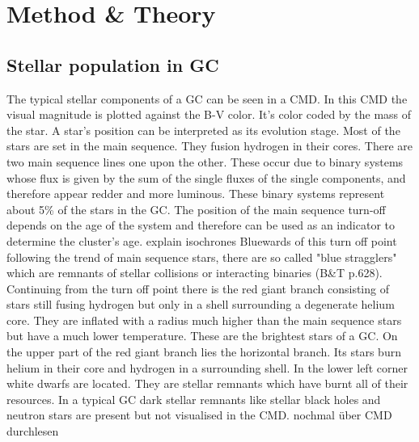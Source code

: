 \section{Method \& Theory}\label{method_theory}
\subsection{Stellar population in GC}\label{cmd_theory}
The typical stellar components of a \ac{GC} can be seen in a \ac{CMD}. In this \ac{CMD} the visual magnitude is plotted against the B-V color. It's color coded by the mass of the star. 
A star's position can be interpreted as its evolution stage. Most of the stars are set in the main sequence. They fusion hydrogen in their cores. There are two main sequence lines one upon the other. These occur due to binary systems whose flux is given by the sum of the single fluxes of the single components, and therefore appear redder and more luminous. These binary systems represent about 5\% of the stars in the \ac{GC}. The position of the main sequence turn-off depends on the age of the system and therefore can be used as an indicator to determine the cluster's age. \color{red} explain isochrones \color{black} Bluewards of this turn off point following the trend of main sequence stars, there are so called "blue stragglers" which are remnants of stellar collisions or interacting binaries (B\&T p.628). Continuing from the turn off point there is the red giant branch consisting of stars still fusing hydrogen but only in a shell surrounding a degenerate helium core. They are inflated with a radius much higher than the main sequence stars but have a much lower temperature. These are the brightest stars of a \ac{GC}. On the upper part of the red giant branch lies the horizontal branch. Its stars burn helium in their core and hydrogen in a surrounding shell. In the lower left corner white dwarfs are located. They are stellar remnants which have burnt all of their resources. In a typical \ac{GC} dark stellar remnants like stellar black holes and neutron stars are present but not visualised in the \ac{CMD}. \color{red} nochmal über \ac{CMD} durchlesen\color{black} 
